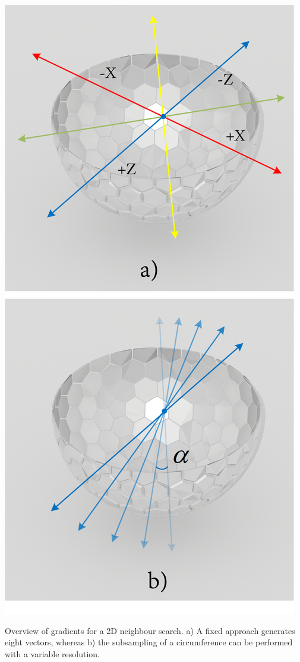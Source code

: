 \begin{marginfigure}[-8.cm]
    \centering
    \includegraphics[width=\linewidth]{figs/lidar_optimization/neighbour_search.png}
	\caption{Overview of gradients for a 2D neighbour search. a) A fixed approach generates eight vectors, whereas b) the subsampling of a circumference can be performed with a variable resolution.}
	\label{fig:neighbour_search}
\end{marginfigure}
